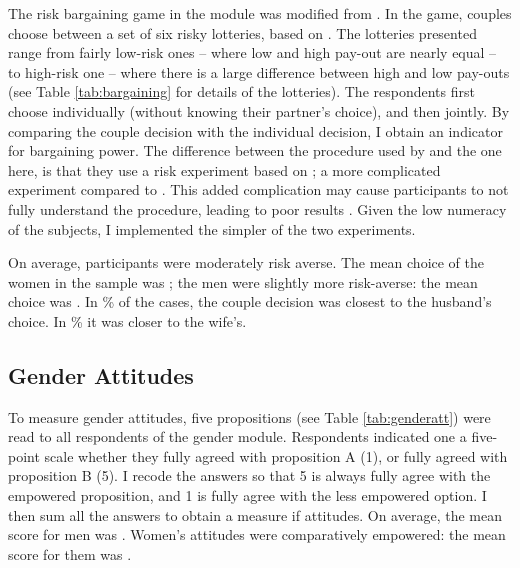 \documentclass[10pt,a4paper]{scrartcl} %
\begin{document}
The risk bargaining game in the module was modified from \cite{Martinsson2009}. In the game, couples choose between a set of six risky lotteries, based on \cite{Eckel2002}. The lotteries presented range from fairly low-risk ones -- where low and high pay-out are nearly equal -- to high-risk one -- where there is a large difference between high and low pay-outs (see Table \ref{tab:bargaining} for details of the lotteries). The respondents first choose individually (without knowing their partner's choice), and then jointly. By comparing the couple decision with the individual decision, I obtain an indicator for bargaining power. The difference between the procedure used by \cite{Martinsson2009} and the one here, is that they use a risk experiment based on \cite{Holt2002}; a more complicated experiment compared to \citeauthor{Eckel2002}. This added complication may cause participants to not fully understand the procedure, leading to poor results \citep{Dave2010a}. Given the low numeracy of the subjects, I implemented the simpler of the two experiments.

On average, participants were moderately risk averse. The mean choice of the women in the sample was ; the men were slightly more risk-averse:  the mean choice was . In \% of the cases, the couple decision was closest to the husband's choice. In \% it was closer to the wife's.


\subsection*{Gender Attitudes}
 To measure gender attitudes, five propositions (see Table \ref{tab:genderatt}) were read to all respondents of the gender module. Respondents indicated one a five-point scale whether they fully agreed with proposition A (1), or fully agreed with proposition B (5). I recode the answers so that 5 is always fully agree with the empowered proposition, and 1 is fully agree with the less empowered option. I then sum all the answers to obtain a measure if attitudes. On average, the mean score for men was  . Women's attitudes were comparatively empowered: the mean score for them was .
\end{document}
